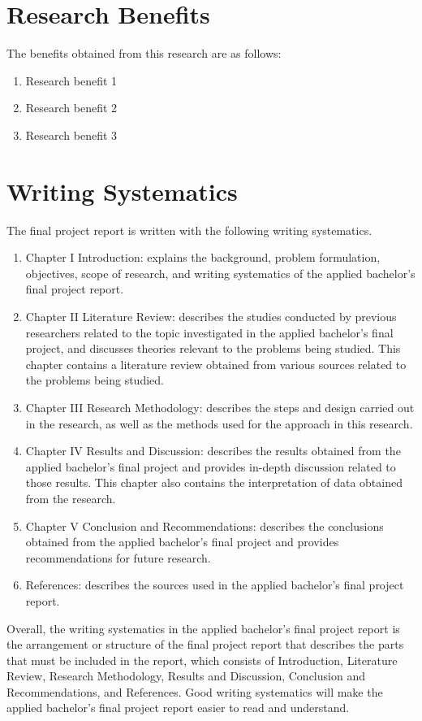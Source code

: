 \section{Research Benefits}
The benefits obtained from this research are as follows:
\begin{enumerate}
    \item Research benefit 1
    \item Research benefit 2
    \item Research benefit 3
\end{enumerate}

\section{Writing Systematics}
The final project report is written with the following writing systematics.
\begin{enumerate}
    \item Chapter I Introduction: explains the background, problem formulation, objectives, scope of research, and writing systematics of the applied bachelor's final project report.
    \item Chapter II Literature Review: describes the studies conducted by previous researchers related to the topic investigated in the applied bachelor's final project, and discusses theories relevant to the problems being studied. This chapter contains a literature review obtained from various sources related to the problems being studied.
    \item Chapter III Research Methodology: describes the steps and design carried out in the research, as well as the methods used for the approach in this research.
    \item Chapter IV Results and Discussion: describes the results obtained from the applied bachelor's final project and provides in-depth discussion related to those results. This chapter also contains the interpretation of data obtained from the research.
    \item Chapter V Conclusion and Recommendations: describes the conclusions obtained from the applied bachelor's final project and provides recommendations for future research.
    \item References: describes the sources used in the applied bachelor's final project report.
\end{enumerate}

Overall, the writing systematics in the applied bachelor's final project report is the arrangement or structure of the final project report that describes the parts that must be included in the report, which consists of Introduction, Literature Review, Research Methodology, Results and Discussion, Conclusion and Recommendations, and References. Good writing systematics will make the applied bachelor's final project report easier to read and understand.
